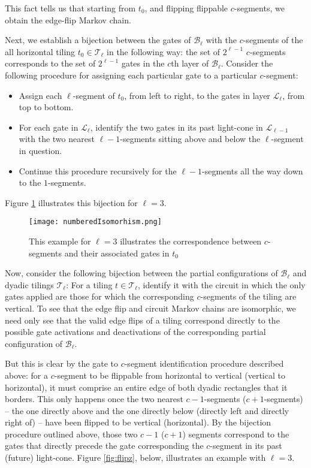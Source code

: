\documentclass[11pt,letterpaper]{article}
\theoremstyle{definition}
\theoremstyle{remark}
\newcommand{\cB}{\mathcal B}
\newcommand{\cL}{\mathcal L}
\newcommand{\cT}{\mathcal T}
\numberwithin{equation}{section}
\theoremstyle{definition}
\begin{document}
This fact tells us that starting from $t_0$, and flipping flippable $c$-segments, we obtain the edge-flip Markov chain.

Next, we establish a bijection between the gates of $\cB_{\ell}$ with the $c$-segments of the all horizontal tiling $t_0\in\cT_{\ell}$ in the following way: the set of $2^{\ell-1}$ $c$-segments corresponds to the set of $2^{\ell-1}$ gates in the $c$th layer of $\cB_{\ell}$. Consider the following procedure for assigning each particular gate to a particular $c$-segment:
\begin{itemize}
  \item Assign each $\ell$-segment of $t_0$, from left to right, to the gates in layer $\cL_{\ell}$, from top to bottom.
  \item For each gate in $\mathcal{L}_{\ell}$, identify the two gates in its past light-cone in $\mathcal{L}_{\ell-1}$ with the two nearest $\ell-1$-segments sitting above and below the $\ell$-segment in question.
  \item Continue this procedure recursively for the $\ell-1$-segments all the way down to the $1$-segments.
\end{itemize}

Figure \ref{fig:niso} illustrates this bijection for $\ell=3$.

\begin{figure}[h]
\begin{center}
\texttt{[image: numberedIsomorhism.png]}
\end{center}
\caption{This example for $\ell=3$ illustrates the correspondence between $c$-segments and their associated gates in $t_0$}
\label{fig:niso}
\end{figure}

Now, consider the following bijection between the partial configurations of $\cB_{\ell}$ and dyadic tilings $\cT_{\ell}$: For a tiling $t\in \cT_{\ell}$, identify it with the circuit in which the only gates applied are those for which the corresponding $c$-segments of the tiling are vertical. To see that the edge flip and circuit Markov chains are isomorphic, we need only see that the valid edge flips of a tiling correspond directly to the possible gate activations and deactivations of the corresponding partial configuration of $\cB_{\ell}$.

But this is clear by the gate to $c$-segment identification procedure described above: for a $c$-segment to be flippable from horizontal to vertical (vertical to horizontal), it must comprise an entire edge of both dyadic rectangles that it borders. This only happens once the two nearest $c-1$-segments ($c+1$-segments) -- the one directly above and the one directly below (directly left and directly right of) -- have been flipped to be vertical (horizontal). By the bijection procedure outlined above, those two $c-1$ ($c+1$) segments correspond to the gates that directly precede the gate corresponding the $c$-segment in its past (future) light-cone. Figure \ref{fig:flipz}, below, illustrates an example with $\ell=3$.
\end{document}
